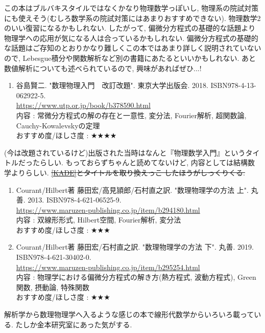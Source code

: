 \documentclass[10pt,a4paper]{jsarticle}
\begin{document}
    この本はブルバキスタイルではなくかなり物理数学っぽいし, 物理系の院試対策にも使えそう(むしろ数学系の院試対策にはあまりおすすめできない). 物理数学2のいい復習になるかもしれない. したがって, 偏微分方程式の基礎的な話題より物理学への応用が気になる人は合っているかもしれない. 偏微分方程式の基礎的な話題はご存知のとおりかなり難しくこの本ではあまり詳しく説明されていないので, Lebesgue積分や関数解析など別の書籍にあたるといいかもしれない. あと数値解析についても述べられているので, 興味があればぜひ...! 
    \begin{enumerate}
        \renewcommand{\theenumi}{[DE\arabic{enumi}]}
        \renewcommand{\labelenumi}{\theenumi}
        \setcounter{enumi}{2}
        \item \label{TKDE} 谷島賢二. "数理物理入門　改訂改題". 東京大学出版会. 2018. ISBN978-4-13-062922-5. \\
        \url{https://www.utp.or.jp/book/b378590.html} \\
        内容 : 常微分方程式の解の存在と一意性, 変分法, Fourier解析, 超関数論, Cauchy-Kowalevskyの定理\\
        おすすめ度/ほしさ度 : $\bigstar \bigstar \bigstar \bigstar $
    \end{enumerate}\par 
    (今は改題されているけど)出版された当時はなんと『物理数学入門』というタイトルだったらしい. もっておらずちゃんと読めてないけど, 内容としては結構数学よりらしい. \sout{\ref{KADE}とタイトルを取り換えっこ したほうがしっくりくる. }
    \begin{enumerate}
        \renewcommand{\theenumi}{[DE\arabic{enumi}]}
        \renewcommand{\labelenumi}{\theenumi}
        \setcounter{enumi}{3}
        \item \label{CHDE1} Courant/Hilbert著 藤田宏/高見頴郎/石村直之訳. "数理物理学の方法 上". 丸善. 2013. ISBN978-4-621-06525-9. \\
        \url{https://www.maruzen-publishing.co.jp/item/b294180.html} \\
        内容 : 双線形形式, Hilbert空間, Fourier解析, 変分法\\
        おすすめ度/ほしさ度 : $\bigstar \bigstar \bigstar $
        \item \label{CHDE2} Courant/Hilbert著 藤田宏/石村直之訳. "数理物理学の方法 下". 丸善. 2019. ISBN978-4-621-30402-0. \\
        \url{https://www.maruzen-publishing.co.jp/item/b295254.html} \\
        内容 : 物理学における偏微分方程式の解き方(熱方程式, 波動方程式), Green関数, 摂動論, 特殊関数\\
        おすすめ度/ほしさ度 : $\bigstar \bigstar \bigstar $
    \end{enumerate}\par
    解析学から数理物理学へ入るような感じの本で線形代数学からいろいろ載っている. たしか金本研究室にあった気がする. 
\end{document}
